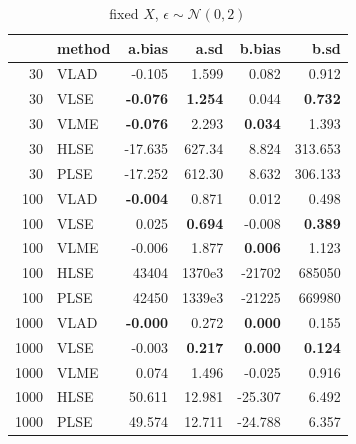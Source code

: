 \documentclass[twoside]{article}
\begin{document}
\begin{table}[ht]
\centering
\caption{fixed $X$, $\epsilon \sim \mathcal{N}(0,2)$}
\begin{tabular}{rlrrrr}
  \hline
 & method & a.bias & a.sd & b.bias & b.sd \\ 
  \hline
  30 & VLAD & -0.105 & 1.599 & 0.082 & 0.912 \\ 
  30 & VLSE & \textbf{-0.076} & \textbf{1.254} & 0.044 & \textbf{0.732} \\ 
  30 & VLME & \textbf{-0.076} & 2.293 & \textbf{0.034} & 1.393 \\ 
  30 & HLSE & -17.635 & 627.34 & 8.824 & 313.653 \\ 
  30 & PLSE & -17.252 & 612.30 & 8.632 & 306.133 \\ 
  \hline
  100 & VLAD & \textbf{-0.004} & 0.871 & 0.012 & 0.498 \\ 
  100 & VLSE & 0.025 & \textbf{0.694} & -0.008 & \textbf{0.389} \\ 
  100 & VLME & -0.006 & 1.877 & \textbf{0.006} & 1.123 \\ 
  100 & HLSE & 43404 & 1370e3 & -21702 & 685050 \\ 
  100 & PLSE & 42450 & 1339e3 & -21225 & 669980 \\ 
  \hline
  1000 & VLAD & \textbf{-0.000} & 0.272 & \textbf{0.000} & 0.155 \\ 
  1000 & VLSE & -0.003 & \textbf{0.217} & \textbf{0.000} & \textbf{0.124} \\ 
  1000 & VLME & 0.074 & 1.496 & -0.025 & 0.916 \\ 
  1000 & HLSE & 50.611 & 12.981 & -25.307 & 6.492 \\ 
  1000 & PLSE & 49.574 & 12.711 & -24.788 & 6.357 \\ 
  \hline
\end{tabular}
\end{table}
\end{document}
